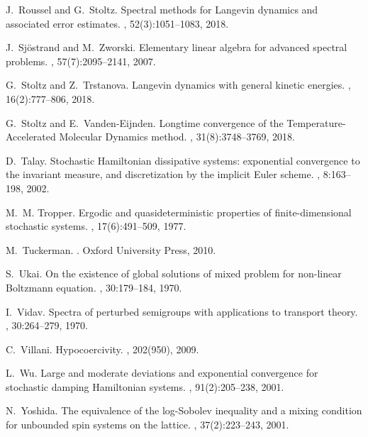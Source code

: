 \documentclass{article}
\begin{document}
\begin{thebibliography}{10}
J.~Roussel and G.~Stoltz.
\newblock Spectral methods for {L}angevin dynamics and associated error
  estimates.
, 52(3):1051--1083, 2018.

J.~Sj\"{o}strand and M.~Zworski.
\newblock Elementary linear algebra for advanced spectral problems.
, 57(7):2095--2141, 2007.

G.~Stoltz and Z.~Trstanova.
\newblock Langevin dynamics with general kinetic energies.
, 16(2):777--806, 2018.

G.~Stoltz and E.~Vanden-Eijnden.
\newblock Longtime convergence of the {Temperature-Accelerated Molecular
  Dynamics} method.
, 31(8):3748--3769, 2018.

D.~Talay.
\newblock Stochastic {H}amiltonian dissipative systems: exponential convergence
  to the invariant measure, and discretization by the implicit {E}uler scheme.
, 8:163--198, 2002.

M.~M. Tropper.
\newblock Ergodic and quasideterministic properties of finite-dimensional
  stochastic systems.
, 17(6):491--509, 1977.

M.~Tuckerman.
.
\newblock Oxford University Press, 2010.

S.~Ukai.
\newblock On the existence of global solutions of mixed problem for non-linear
  {B}oltzmann equation.
, 30:179--184, 1970.

I.~Vidav.
\newblock Spectra of perturbed semigroups with applications to transport
  theory.
, 30:264--279, 1970.

C.~Villani.
\newblock Hypocoercivity.
, 202(950), 2009.

L.~Wu.
\newblock Large and moderate deviations and exponential convergence for
  stochastic damping {H}amiltonian systems.
, 91(2):205--238, 2001.

N.~Yoshida.
\newblock The equivalence of the log-{S}obolev inequality and a mixing
  condition for unbounded spin systems on the lattice.
, 37(2):223--243,
  2001.

\end{thebibliography}
\end{document}
